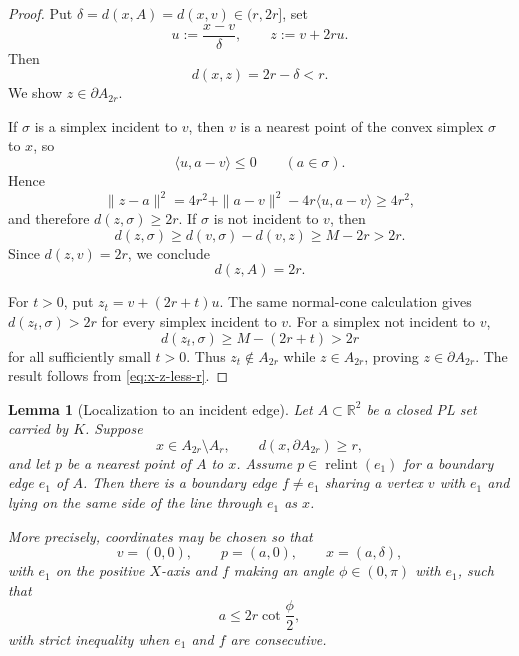 \documentclass[11pt]{article}
\newtheorem{lemma}[theorem]{Lemma}
\newcommand{\R}{\mathbb R}
\newcommand{\relint}{\operatorname{relint}}
\numberwithin{equation}{section}
\begin{document}
\begin{proof}
Put $\delta=d(x,A)=d(x,v)\in(r,2r]$, set
\[
u:=\frac{x-v}{\delta},
\qquad
z:=v+2ru.
\]
Then
\begin{equation}\label{eq:x-z-less-r}
d(x,z)=2r-\delta<r.
\end{equation}
We show $z\in\partial A_{2r}$.

If $\sigma$ is a simplex incident to $v$, then $v$ is a nearest point of the convex simplex $\sigma$ to $x$, so
\[
\langle u,a-v\rangle\le0
\qquad(a\in\sigma).
\]
Hence
\[
\|z-a\|^2
=4r^2+\|a-v\|^2-4r\langle u,a-v\rangle
\ge4r^2,
\]
and therefore $d(z,\sigma)\ge2r$. If $\sigma$ is not incident to $v$, then
\[
d(z,\sigma)\ge d(v,\sigma)-d(v,z)\ge M-2r>2r.
\]
Since $d(z,v)=2r$, we conclude
\[
d(z,A)=2r.
\]

For $t>0$, put $z_t=v+(2r+t)u$. The same normal-cone calculation gives $d(z_t,\sigma)>2r$ for every simplex incident to $v$. For a simplex not incident to $v$,
\[
d(z_t,\sigma)\ge M-(2r+t)>2r
\]
for all sufficiently small $t>0$. Thus $z_t\notin A_{2r}$ while $z\in A_{2r}$, proving $z\in\partial A_{2r}$. The result follows from \eqref{eq:x-z-less-r}.
\end{proof}

\begin{lemma}[Localization to an incident edge]\label{lem:localize-edge}
Let $A\subset\R^2$ be a closed PL set carried by $K$. Suppose
\[
x\in A_{2r}\setminus A_r,
\qquad
d(x,\partial A_{2r})\ge r,
\]
and let $p$ be a nearest point of $A$ to $x$. Assume $p\in\relint(e_1)$ for a boundary edge $e_1$ of $A$. Then there is a boundary edge $f\ne e_1$ sharing a vertex $v$ with $e_1$ and lying on the same side of the line through $e_1$ as $x$.

More precisely, coordinates may be chosen so that
\[
v=(0,0),
\qquad p=(a,0),
\qquad x=(a,\delta),
\]
with $e_1$ on the positive $X$-axis and $f$ making an angle $\phi\in(0,\pi)$ with $e_1$, such that
\begin{equation}\label{eq:a-phi-bound}
a\le2r\cot\frac\phi2,
\end{equation}
with strict inequality when $e_1$ and $f$ are consecutive.
\end{lemma}
\end{document}
